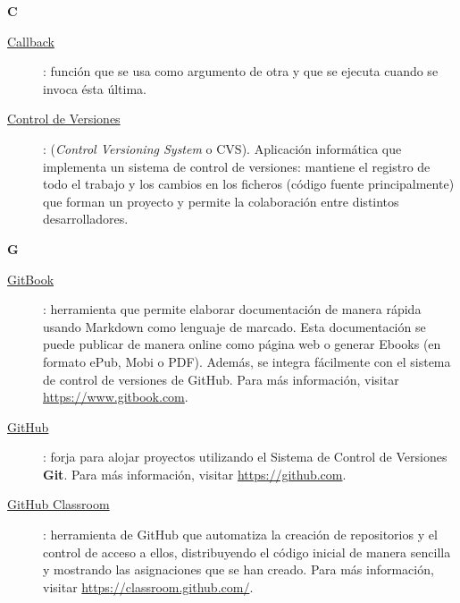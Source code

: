 \bigskip
\bigskip
{\bfseries {\Huge C}}\label{Apendice1:C}
\bigskip
\bigskip

\begin{description}
  \item[\underline{Callback}\label{apend1:callback}]: función que se usa como argumento de otra y que se ejecuta cuando se invoca ésta última. 
  \bigskip
\end{description}

\begin{description}
   \item[\underline{Control de Versiones}\label{apend1:cvs}]: (\textit{Control Versioning System} o CVS). Aplicación informática que implementa un sistema de control de versiones: mantiene el registro de todo el trabajo y los cambios en los ficheros (código fuente principalmente) que forman un proyecto y permite la colaboración entre distintos desarrolladores.
  \bigskip
\end{description}


{\bfseries {\Huge G}}\label{Apendice1:G}
\bigskip
\bigskip

\begin{description}
  \item[\underline{GitBook}\label{apend1:gitbook}]: herramienta que permite elaborar documentación de manera rápida usando Markdown como lenguaje de marcado. Esta documentación se puede publicar de manera online como página web o generar Ebooks (en formato ePub, Mobi o PDF). Además, se integra fácilmente con el sistema de control de versiones de GitHub. Para más información, visitar {\small \url{https://www.gitbook.com}}.
  \bigskip
\end{description}

\begin{description}
  \item[\underline{GitHub}\label{apend1:github}]: forja para alojar proyectos utilizando el Sistema de Control de Versiones {\bfseries Git}. Para más información, visitar {\small \url{https://github.com}}.
  \bigskip
\end{description}

\begin{description}
  \item[\underline{GitHub Classroom}\label{apend1:github-classroom}]: herramienta de GitHub que automatiza la creación de repositorios y el control de acceso a ellos, distribuyendo el código inicial de manera sencilla y mostrando las asignaciones que se han creado. Para más información, visitar {\small \url{https://classroom.github.com/}}.
  \bigskip
\end{description}

